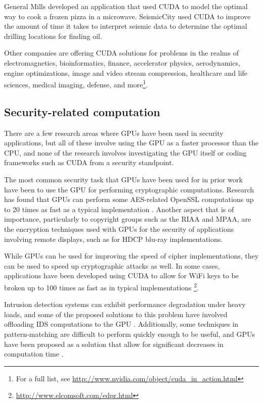 \documentclass[letterpaper,10pt]{article}
\begin{document}
\begin{multicols}{2}
  General Mills developed an application that used CUDA to model the optimal
way to cook a frozen pizza in a microwave. SeismicCity used CUDA to improve the
amount of time it takes to interpret seismic data to determine the optimal
drilling locations for finding oil\cite{cudainaction}.
  
  Other companies are offering CUDA solutions for problems in the realms of
electromagnetics, bioinformatics, finance, accelerator physics, aerodynamics,
engine optimizations, image and video stream compression, healthcare and life
sciences, medical imaging, defense, and more\footnote{For a full list, see \url{http://www.nvidia.com/object/cuda\_in\_action.html}}.
  
\subsection{Security-related computation}
  There are a few research areas where GPUs have been used in security applications, but all of these involve using the GPU as a faster processor than the CPU, and none of the research involves investigating the GPU itself or coding frameworks such as CUDA from a security standpoint.
  
  The most common security task that GPUs have been used for in prior work have been to use the GPU for performing cryptographic computations. Research has found that GPUs can perform some AES-related OpenSSL computations up to 20 times as fast as a typical implementation
\cite{cudaaes}. Another aspect that is of importance, particularly to copyright groups such as the RIAA and MPAA, are the encryption techniques used with GPUs for the security of applications involving remote displays, such as for HDCP blu-ray implementations\cite{cryptographics}.
  
  While GPUs can be used for improving the speed of cipher implementations, they can be used to speed up cryptographic attacks as well. In some cases, applications have been developed using CUDA to allow for WiFi keys to be broken up to 100 times as fast as in typical implementations \footnote{\url{http://www.elcomsoft.com/edpr.html}}.
  
  Intrusion detection systems can exhibit performance degradation under heavy
  loads, and some of the proposed solutions to this problem have involved
  offloading IDS computations to the GPU
  \cite{offloadids}.
  Additionally, some techniques in pattern-matching are difficult to perform
  quickly enough to be useful, and GPUs have been proposed as a solution that
  allow for significant decreases in computation time
  \cite{gpuids}.


\end{multicols}
\end{document}
